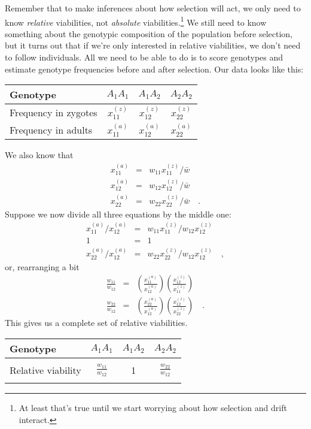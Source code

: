 \documentclass[12pt]{article}
\begin{document}
Remember that to make inferences about how selection will act, we only
need to know {\it relative\/} viabilities, not {\it absolute\/}
viabilities.\footnote{At least that's true until we start worrying
  about how selection and drift interact.} We still need to know
something about the genotypic composition of the population before
selection, but it turns out that if we're only interested in relative
viabilities, we don't need to follow individuals. All we need to be
able to do is to score genotypes and estimate genotype frequencies
before and after selection. Our data looks like this:
\begin{center}
\begin{tabular}{l|ccc}
\hline\hline
Genotype & $A_1A_1$ & $A_1A_2$ & $A_2A_2$ \\
\hline
Frequency in zygotes & $x_{11}^{(z)}$ & $x_{12}^{(z)}$ &
$x_{22}^{(z)}$ \\
Frequency in adults  & $x_{11}^{(a)}$ & $x_{12}^{(a)}$ &
$x_{22}^{(a)}$ \\
\hline
\end{tabular}
\end{center}
We also know that
\begin{eqnarray*}
x_{11}^{(a)} &=& w_{11}x_{11}^{(z)}/\bar w \\
x_{12}^{(a)} &=& w_{12}x_{12}^{(z)}/\bar w \\
x_{22}^{(a)} &=& w_{22}x_{22}^{(z)}/\bar w \quad .
\end{eqnarray*}
Suppose we now divide all three equations by the middle one:
\begin{eqnarray*}
x_{11}^{(a)}/x_{12}^{(a)} &=& w_{11}x_{11}^{(z)}/w_{12}x_{12}^{(z)} \\
1 &=& 1 \\
x_{22}^{(a)}/x_{12}^{(a)} &=& w_{22}x_{22}^{(z)}/w_{12}x_{12}^{(z)} \quad ,
\end{eqnarray*}
or, rearranging a bit
\begin{eqnarray}
\frac{w_{11}}{w_{12}} &=& \left(\frac{x_{11}^{(a)}}{x_{12}^{(a)}}\right)
                          \left(\frac{x_{12}^{(z)}}{x_{11}^{(z)}}\right) 
\label{eq:est-rel-viability-1}
\\
\frac{w_{22}}{w_{12}} &=& \left(\frac{x_{22}^{(a)}}{x_{12}^{(a)}}\right)
                          \left(\frac{x_{12}^{(z)}}{x_{22}^{(z)}}\right)
\quad . \label{eq:est-rel-viability-2}
\end{eqnarray}
This gives us a complete set of relative viabilities.
\begin{center}
\begin{tabular}{l|ccc}
\hline\hline
Genotype & $A_1A_1$ & $A_1A_2$ & $A_2A_2$ \\
\hline
\\
Relative viability & $\frac{w_{11}}{w_{12}}$ & 1 &
$\frac{w_{22}}{w_{12}}$ \\
\\
\hline
\end{tabular}
\end{center}
\end{document}
